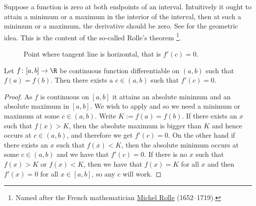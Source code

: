 \documentclass[12pt]{book}
\begin{document}
Suppose a function is zero at both endpoints of an interval.
Intuitively it ought to attain a minimum or a maximum in the interior of the
interval,
then at such a minimum or a maximum, the derivative should be zero.
See  for the geometric idea.
This is the content of the
so-called Rolle's theorem%
\footnote{Named after the French mathematician
\href{https://en.wikipedia.org/wiki/Michel_Rolle}{Michel Rolle}
(1652--1719).}.

\begin{figure}[h!t]
\begin{center}

\caption{Point where tangent line is horizontal, that is $f'(c) =
0$.\label{rollefig}}
\end{center}
\end{figure}

\begin{thm}[Rolle] \label{thm:rolle}
Let $f \colon [a,b] \to \R$ be continuous function
differentiable on $(a,b)$ such that $f(a) = f(b)$.
Then there exists a $c \in (a,b)$ such that $f'(c) = 0$.
\end{thm}

\begin{proof}
As $f$ is continuous on $[a,b]$ it attains an absolute minimum and an
absolute 
maximum in $[a,b]$.
We wish to apply  and
so we need a minimum or maximum at some $c \in (a,b)$.
Write $K := f(a) = f(b)$.
If there exists an $x$ such that $f(x) > K$, then the absolute
maximum is bigger than $K$ and hence occurs at $c \in (a,b)$, and
therefore we get $f'(c) = 0$.
On the other hand if there exists an $x$
such that $f(x) < K$, then the absolute minimum occurs at some
$c \in (a,b)$ and we have that $f'(c) = 0$.
If there is no $x$ such that
$f(x) > K$ or
$f(x) < K$, then we have that $f(x) = K$ for all $x$ and then
$f'(x) = 0$ for all $x \in [a,b]$, so any $c$ will work.
\end{proof}
\end{document}
